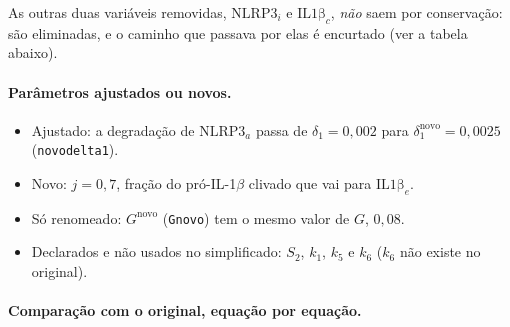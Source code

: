 \documentclass[11pt]{article}
\begin{document}
As outras duas variáveis removidas, $\mathrm{NLRP3}_i$ e $\mathrm{IL1\beta}_c$, \emph{não}
saem por conservação: são eliminadas, e o caminho que passava por elas é encurtado (ver a
tabela abaixo).

\paragraph{Parâmetros ajustados ou novos.}
\begin{itemize}
\item Ajustado: a degradação de $\mathrm{NLRP3}_a$ passa de $\delta_1 = 0{,}002$ para
  $\delta_1^{\mathrm{novo}} = 0{,}0025$ (\texttt{novodelta1}).
\item Novo: $j = 0{,}7$, fração do pró-IL-1$\beta$ clivado que vai para
  $\mathrm{IL1\beta}_e$.
\item Só renomeado: $G^{\mathrm{novo}}$ (\texttt{Gnovo}) tem o mesmo valor de $G$, $0{,}08$.
\item Declarados e não usados no simplificado: $S_2$, $k_1$, $k_5$ e $k_6$ ($k_6$ não existe no
  original).
\end{itemize}

\paragraph{Comparação com o original, equação por equação.}
\end{document}
